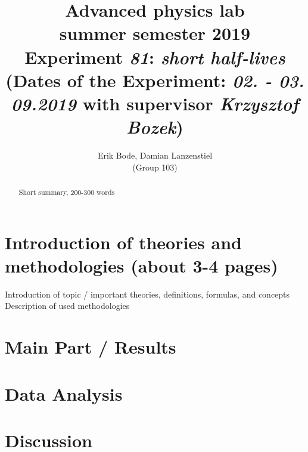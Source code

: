 \documentclass[titlepage,11pt,a4paper]{article}
\begin{document}
	\title{
		\large Advanced physics lab\\
		summer semester 2019 \\[4mm]
		\textbf{\LARGE 
			Experiment \emph{81}: \emph{short half-lives}
		} \\[3mm]
		(Dates of the Experiment: \emph{02. - 03. 09.2019} with supervisor \emph{Krzysztof Bozek}) \\}
	\author{Erik Bode, Damian Lanzenstiel \\ (Group 103)}
	\maketitle
	\begin{abstract}
		Short summary, 200-300 words
	\end{abstract}
	\tableofcontents
	\listoffigures
	\listoftables

\section{Introduction of theories and methodologies (about 3-4 pages)}
Introduction of topic / important theories, definitions, formulas, and concepts
Description of used methodologies
\section{Main Part / Results}
\section{Data Analysis}
\section{Discussion}
\end{document}
